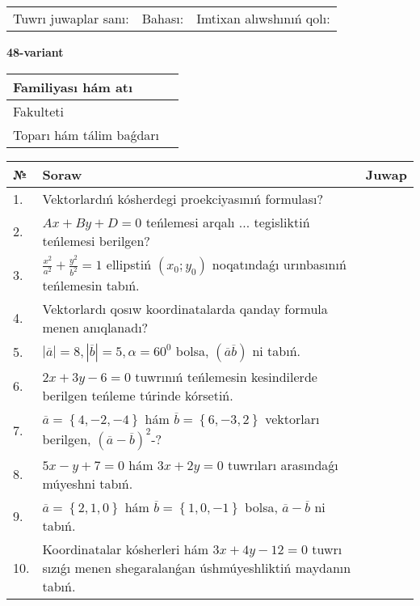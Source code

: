 \documentclass{article}
\begin{document}
\vspace{1cm}

\begin{tabular}{lll}
Tuwrı juwaplar sanı: \underline{\hspace{1.5cm}} & 
Bahası: \underline{\hspace{1.5cm}} & 
Imtixan alıwshınıń qolı: \underline{\hspace{2cm}} \\
\end{tabular}

\egroup

\newpage


\textbf{48-variant}\\

\bgroup
\def\arraystretch{1.6} %

\begin{tabular}{|m{5.7cm}|m{9.5cm}|}
\hline
Familiyası hám atı & \\
\hline
Fakulteti  & \\
\hline
Toparı hám tálim baǵdarı  & \\
\hline
\end{tabular}

\vspace{1cm}

\begin{tabular}{|m{0.7cm}|m{10cm}|m{4cm}|}
\hline
№ & Soraw & Juwap \\
\hline
1. & Vektorlardıń kósherdegi proekciyasınıń formulası? &  \\
\hline
2. & $Ax+By+D=0$ teńlemesi arqalı ... tegisliktiń teńlemesi berilgen? &  \\
\hline
3. & $\frac{x^2}{a^2}+\frac{y^2}{b^2}=1$ ellipstiń $(x_0;y_0)$ noqatındaǵı urınbasınıń teńlemesin tabıń. &  \\
\hline
4. & Vektorlardı qosıw koordinatalarda qanday formula menen anıqlanadı? &  \\
\hline
5. & $\left| \overline{a} \right|=8, \left| \overline{b} \right|=5, \alpha=60^{0}$ bolsa, $( \overline{a}\overline{b} )$ ni tabıń. &  \\
\hline
6. & $2x+3y-6=0$ tuwrınıń teńlemesin kesindilerde berilgen teńleme túrinde kórsetiń. &  \\
\hline
7. & $\overline{a}=\left\{ 4,-2,-4 \right\}$ hám $\overline{b}=\left\{ 6,-3, 2 \right\}$ vektorları berilgen, $(\overline{a}-\overline{b}) ^{2}$-? &  \\
\hline
8. & $5x-y+7=0$ hám $3x+2y=0$ tuwrıları arasındaǵı múyeshni tabıń. &  \\
\hline
9. & $\overline{a}=\left\{ 2, 1, 0 \right\}$ hám $\overline{b}=\left\{ 1, 0,-1 \right\}$ bolsa, $\overline{a}-\overline{b}$ ni tabıń. &  \\
\hline
10. & Koordinatalar kósherleri hám $ 3x+4y-12=0 $ tuwrı sızıǵı menen shegaralanǵan úshmúyeshliktiń maydanın tabıń. &  \\
\hline
\end{tabular}
\end{document}
